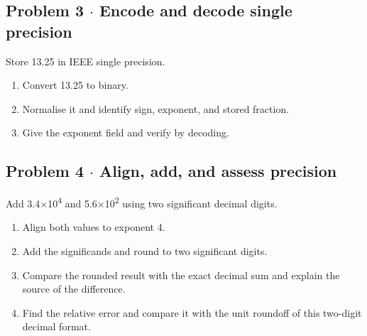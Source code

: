 \documentclass[11pt]{article}
\begin{document}
\begin{keepsection}
\begin{keepsection}
\end{keepsection}

\begin{keepsection}
\subsection{Problem 3 \ensuremath{\cdot} Encode and decode single precision}

Store 13.25 in IEEE single precision.

\begin{enumerate}
\item Convert 13.25 to binary.
\item Normalise it and identify sign, exponent, and stored fraction.
\item Give the exponent field and verify by decoding.
\end{enumerate}

\end{keepsection}

\begin{keepsection}
\subsection{Problem 4 \ensuremath{\cdot} Align, add, and assess precision}

Add 3.4\ensuremath{\times}10\textsuperscript{4} and 5.6\ensuremath{\times}10\textsuperscript{2} using two significant decimal digits.

\begin{enumerate}
\item Align both values to exponent 4.
\item Add the significands and round to two significant digits.
\item Compare the rounded result with the exact decimal sum and explain the source of the difference.
\item Find the relative error and compare it with the unit roundoff of this two-digit decimal format.
\end{enumerate}

\end{keepsection}


\end{keepsection}
\end{document}

